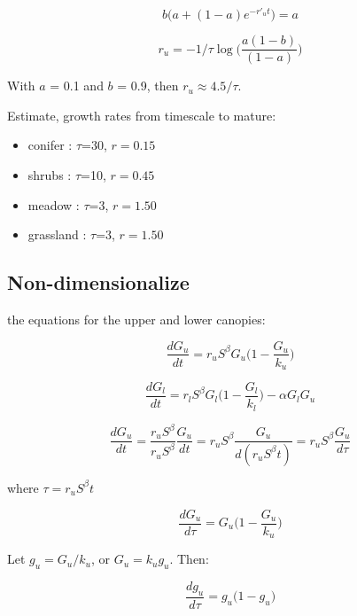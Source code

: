 \documentclass[12pt]{article}
\begin{document}
\begin{equation}
    b ({ a  +(1- a ) e^{-r'_u t}) ={ a  }}
\end{equation}

\begin{equation}
r_u =   - 1/ \tau \log \big(\frac{a (1-b) }{(1- a )}\big)
\end{equation}


With $a$ = 0.1 and $b$ = 0.9, then $r_u \approx 4.5/ \tau$.

Estimate, growth rates from timescale to mature:

\begin{itemize}
\item conifer : $\tau$=30, $r=0.15$
\item shrubs : $\tau$=10, $r=0.45$
\item meadow : $\tau$=3, $r=1.50$
\item grassland : $\tau$=3, $r=1.50$
\end{itemize}


\subsection*{Non-dimensionalize}


 the equations for the upper and lower canopies:

\begin{equation*}
	 \frac{d G_u}{dt} =
	 r_u S^\beta G_u \bigg(1-\frac{G_u}{k_u}\bigg)
\end{equation*}


\begin{equation*}
	 \frac{d G_l}{dt} = r_l S^\beta G_l \bigg(1-\frac{G_l}{k_l}\bigg) - \alpha G_l G_u
\end{equation*}

\begin{equation*}
    \frac{d G_u}{dt} =
     \frac{r_u S^\beta}{r_u S^\beta} \frac{G_u}{dt} =
  	{r_u S^\beta} \frac{G_u}{d(r_u S^\beta t)} =
	r_u S^\beta \frac{G_u}{d \tau}
\end{equation*}

where $\tau = r_u S^\beta t$

\begin{equation*}
    \frac{d G_u}{d\tau} =
    G_u \bigg(1-\frac{G_u}{k_u}\bigg)
\end{equation*}


Let  $g_u = G_u/k_u$, or   $G_u =   k_u g_u$.  Then:

\begin{equation*}
  \frac{d   g_u}{d\tau} =
	 g_u \bigg(1 -  g_u \bigg)
\end{equation*}
\end{document}
